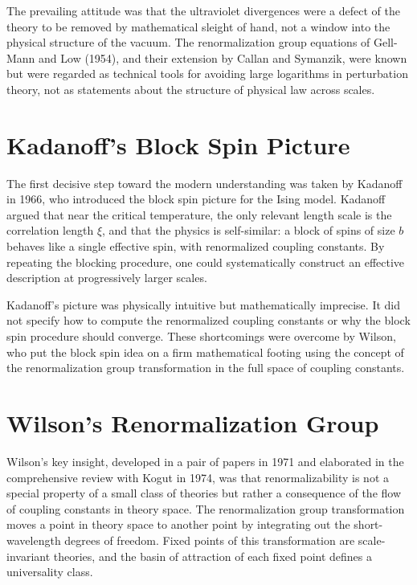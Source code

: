 \documentclass[11pt, twoside, openright]{book}
\theoremstyle{dotted}
\theoremstyle{definition}
\begin{document}
The prevailing attitude was that the ultraviolet divergences were a defect of
the theory to be removed by mathematical sleight of hand, not a window into the
physical structure of the vacuum. The renormalization group equations of Gell-Mann
and Low (1954), and their extension by Callan and Symanzik, were known but were
regarded as technical tools for avoiding large logarithms in perturbation theory,
not as statements about the structure of physical law across scales.

\section{Kadanoff's Block Spin Picture}

The first decisive step toward the modern understanding was taken by Kadanoff in
1966, who introduced the block spin picture for the Ising model. Kadanoff argued
that near the critical temperature, the only relevant length scale is the correlation
length $\xi$, and that the physics is self-similar: a block of spins of size $b$
behaves like a single effective spin, with renormalized coupling constants. By
repeating the blocking procedure, one could systematically construct an effective
description at progressively larger scales.

Kadanoff's picture was physically intuitive but mathematically imprecise. It did
not specify how to compute the renormalized coupling constants or why the block
spin procedure should converge. These shortcomings were overcome by Wilson, who
put the block spin idea on a firm mathematical footing using the concept of the
renormalization group transformation in the full space of coupling constants.

\section{Wilson's Renormalization Group}

Wilson's key insight, developed in a pair of papers in 1971 and elaborated in
the comprehensive review with Kogut in 1974, was that renormalizability is not a
special property of a small class of theories but rather a consequence of the flow
of coupling constants in theory space. The renormalization group transformation
moves a point in theory space to another point by integrating out the short-wavelength
degrees of freedom. Fixed points of this transformation are scale-invariant theories,
and the basin of attraction of each fixed point defines a universality class.
\end{document}
